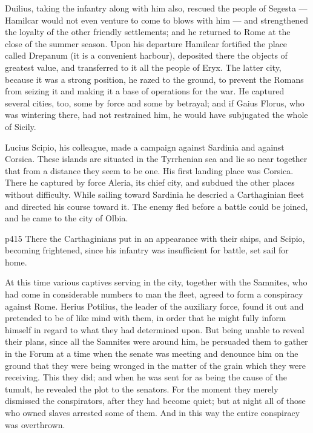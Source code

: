 Duilius, taking the infantry along with him also, rescued the people of Segesta \texthebrew{—} Hamilcar would not even venture to come to blows with him \texthebrew{—} and strengthened the loyalty of the other friendly settlements; and he returned to Rome at the close of the summer season. Upon his departure Hamilcar fortified the place called Drepanum (it is a convenient harbour), deposited there the objects of greatest value, and transferred to it all the people of Eryx. The latter city, because it was a strong position, he razed to the ground, to prevent the Romans from seizing it and making it a base of operations for the war. He captured several cities, too, some by force and some by betrayal; and if Gaius Florus, who was wintering there, had not restrained him, he would have subjugated the whole of Sicily.

Lucius Scipio, his colleague, made a campaign against Sardinia and against Corsica. These islands are situated in the Tyrrhenian sea and lie so near together that from a distance they seem to be one. His first landing place was Corsica. There he captured by force Aleria, its chief city, and subdued the other places without difficulty. While sailing toward Sardinia he descried a Carthaginian fleet and directed his course toward it. The enemy fled before a battle could be joined, and he came to the city of Olbia.

p415 There the Carthaginians put in an appearance with their ships, and Scipio, becoming frightened, since his infantry was insufficient for battle, set sail for home.

At this time various captives serving in the city, together with the Samnites, who had come in considerable numbers to man the fleet, agreed to form a conspiracy against Rome. Herius Potilius, the leader of the auxiliary force, found it out and pretended to be of like mind with them, in order that he might fully inform himself in regard to what they had determined upon. But being unable to reveal their plans, since all the Samnites were around him, he persuaded them to gather in the Forum at a time when the senate was meeting and denounce him on the ground that they were being wronged in the matter of the grain which they were receiving. This they did; and when he was sent for as being the cause of the tumult, he revealed the plot to the senators. For the moment they merely dismissed the conspirators, after they had become quiet; but at night all of those who owned slaves arrested some of them. And in this way the entire conspiracy was overthrown.

